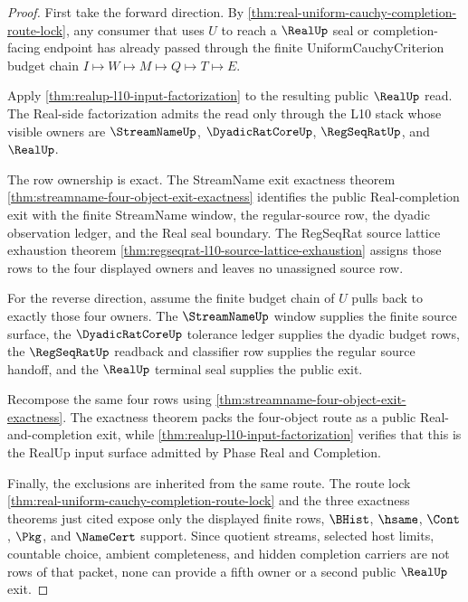 \begin{proof}
First take the forward direction. By
\autoref{thm:real-uniform-cauchy-completion-route-lock}, any consumer that uses
$U$ to reach a $\RealUp$ seal or completion-facing endpoint has already passed
through the finite UniformCauchyCriterion budget chain
$I \longmapsto W \longmapsto M \longmapsto Q \longmapsto T \longmapsto E$.

Apply \autoref{thm:realup-l10-input-factorization} to the resulting public
$\RealUp$ read. The Real-side factorization admits the read only through the
L10 stack whose visible owners are $\StreamNameUp$, $\DyadicRatCoreUp$,
$\RegSeqRatUp$, and $\RealUp$.

The row ownership is exact. The StreamName exit exactness theorem
\autoref{thm:streamname-four-object-exit-exactness} identifies the public
Real-completion exit with the finite StreamName window, the regular-source row,
the dyadic observation ledger, and the Real seal boundary. The RegSeqRat source
lattice exhaustion theorem
\autoref{thm:regseqrat-l10-source-lattice-exhaustion} assigns those rows to the
four displayed owners and leaves no unassigned source row.

For the reverse direction, assume the finite budget chain of $U$ pulls back to
exactly those four owners. The $\StreamNameUp$ window supplies the finite
source surface, the $\DyadicRatCoreUp$ tolerance ledger supplies the dyadic
budget rows, the $\RegSeqRatUp$ readback and classifier row supplies the regular
source handoff, and the $\RealUp$ terminal seal supplies the public exit.

Recompose the same four rows using
\autoref{thm:streamname-four-object-exit-exactness}. The exactness theorem
packs the four-object route as a public Real-and-completion exit, while
\autoref{thm:realup-l10-input-factorization} verifies that this is the RealUp
input surface admitted by Phase Real and Completion.

Finally, the exclusions are inherited from the same route. The route lock
\autoref{thm:real-uniform-cauchy-completion-route-lock} and the three exactness
theorems just cited expose only the displayed finite rows, $\BHist$, $\hsame$,
$\Cont$, $\Pkg$, and $\NameCert$ support. Since quotient streams, selected host
limits, countable choice, ambient completeness, and hidden completion carriers
are not rows of that packet, none can provide a fifth owner or a second public
$\RealUp$ exit.
\end{proof}

